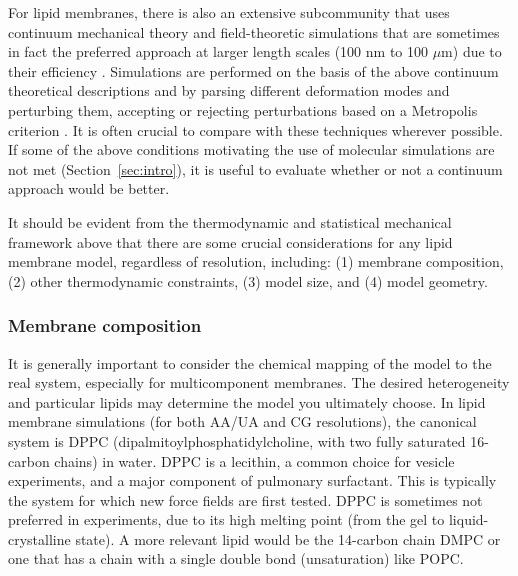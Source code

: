\documentclass[9pt,bestpractices]{livecoms}
\begin{document}
For lipid membranes, there is also an extensive subcommunity that uses continuum mechanical theory and field-theoretic simulations that are sometimes in fact the preferred approach at larger length scales (100 nm to 100 $\mu$m) due to their efficiency \cite{Smirnova2015,Brown2008,Sapp2014}.
Simulations are performed on the basis of the above continuum theoretical descriptions and by parsing different deformation modes and perturbing them, accepting or rejecting perturbations based on a Metropolis criterion \cite{Brannigan2006d}.
It is often crucial to compare with these techniques wherever possible.
If some of the above conditions motivating the use of molecular simulations are not met (Section~\ref{sec:intro}), it is useful to evaluate whether or not a continuum approach would be better.

It should be evident from the thermodynamic and statistical mechanical framework above that there are some crucial considerations for any lipid membrane model, regardless of resolution, including: (1) membrane composition, (2) other thermodynamic constraints, (3) model size, and (4) model geometry.

\subsubsection{Membrane composition}
\label{subsubsec:composition}
It is generally important to consider the chemical mapping of the model to the real system, especially for multicomponent membranes.
The desired heterogeneity and particular lipids may determine the model you ultimately choose.
In lipid membrane simulations (for both AA/UA and CG resolutions), the canonical system is DPPC (dipalmitoylphosphatidylcholine, with two fully saturated 16-carbon chains) in water.
DPPC is a lecithin, a common choice for vesicle experiments, and a major component of pulmonary surfactant.
This is typically the system for which new force fields are first tested.
DPPC is sometimes not preferred in experiments, due to its high melting point (from the gel to liquid-crystalline state).
A more relevant lipid would be the 14-carbon chain DMPC or one that has a chain with a single double bond (unsaturation) like POPC.
\end{document}
